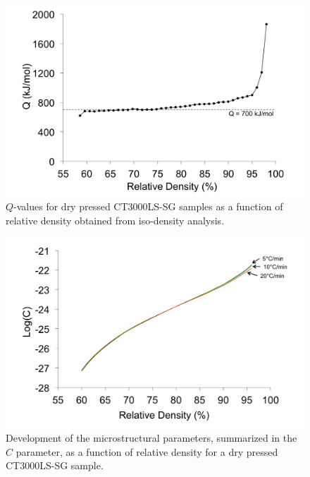 \newpage
\begin{figure}[H]
	\centering
	\includegraphics[width=\textwidth]{Chapter-6/Figures/Figure8.png}
	\caption{$Q$-values for dry pressed CT3000LS-SG samples as a function of relative density obtained from iso-density analysis.}
	\label{Ch6-figure:Figure8}
\end{figure}

\newpage
\begin{figure}[H]
	\centering
	\includegraphics[width=\textwidth]{Chapter-6/Figures/Figure9.png}
	\caption{Development of the microstructural parameters, summarized in the $C$ parameter, as a function of relative density for a dry pressed CT3000LS-SG sample.}
	\label{Ch6-figure:Figure9}
\end{figure}

